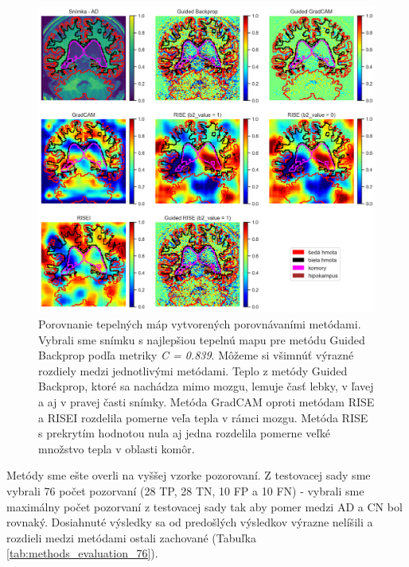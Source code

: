 \begin{figure}[H]
    \centering
    \includegraphics[width=14.5cm]{assets/images/method_evaluation_1.png}
    \caption{\small{Porovnanie tepelných máp vytvorených porovnávaními metódami. Vybrali sme snímku s najlepšiou tepelnú mapu pre metódu Guided Backprop podľa metriky \textit{C = 0.839}. Môžeme si všimnúť výrazné rozdiely medzi jednotlivými metódami. Teplo z metódy Guided Backprop, ktoré sa nachádza mimo mozgu, lemuje časť lebky, v ľavej a aj v pravej časti snímky. Metóda GradCAM oproti metódam RISE a RISEI rozdelila pomerne veľa tepla v rámci mozgu. Metóda RISE s prekrytím hodnotou nula aj jedna rozdelila pomerne veľké množstvo tepla v oblasti komôr.}}
    \label{fig:method_evaluation_1}
\end{figure}

Metódy sme ešte overli na vyššej vzorke pozorovaní. Z testovacej sady sme vybrali 76 počet pozorvaní (28 TP, 28 TN, 10 FP a 10 FN) - vybrali sme maximálny počet pozorvaní z testovacej sady tak aby pomer medzi AD a CN bol rovnaký. Dosiahnuté výsledky sa od predošlých výsledkov výrazne nelíšili a rozdieli medzi metódami ostali zachované (Tabuľka \ref{tab:methods_evaluation_76}).

